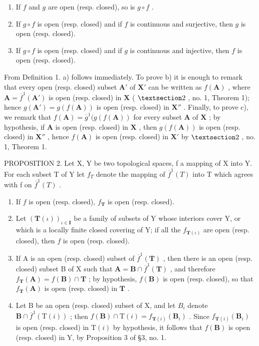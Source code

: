 \begin{enumerate}
\def\labelenumi{\alph{enumi})}
\item
  If \(f\) and \(g\) are open (resp. closed), so is \(g \circ f\) .
\item
  If \(g \circ f\) is open (resp. closed) and if \(f\) is continuous and surjective, then \(g\) is open (resp. closed).
\item
  If \(g \circ f\) is open (resp. closed) and if \(g\) is continuous and injective, then \(f\) is open (resp. closed).
\end{enumerate}

From Definition 1. a) follows immediately. To prove b) it is enough to remark that every open (resp. closed) subset \(\mathbf{A}'\) of \(\mathbf{X}'\) can be written as \(f(\mathbf{A})\) , where \(\mathbf{A} = \overline{f}^{1}(\mathbf{A}')\) is open (resp. closed) in \(\mathbf{X}\) ( \(\S 2\) , no. 1, Theorem 1); hence \(g(\mathbf{A}') = g(f(\mathbf{A}))\) is open (resp. closed) in \(\mathbf{X}''\) . Finally, to prove c), we remark that \(f(\mathbf{A}) = \overline{g}^{1}(g(f(\mathbf{A}))\) for every subset \(\mathbf{A}\) of \(\mathbf{X}\) ; by hypothesis, if \(\mathbf{A}\) is open (resp. closed) in \(\mathbf{X}\) , then \(g(f(\mathbf{A}))\) is open (resp. closed) in \(\mathbf{X}''\) , hence \(f(\mathbf{A})\) is open (resp. closed) in \(\mathbf{X}'\) by \(\S 2\) , no. 1, Theorem 1.

PROPOSITION 2. Let X, Y be two topological spaces, f a mapping of X into Y. For each subset T of Y let \(f_{T}\) denote the mapping of \(\overline{f}^{1}(T)\) into T which agrees with f on \(\overline{f}^{1}(T)\) .

\begin{enumerate}
\def\labelenumi{\alph{enumi})}
\item
  If \(f\) is open (resp. closed), \(f_{\mathbf{T}}\) is open (resp. closed).
\item
  Let \((\mathbf{T}(\iota))_{\iota \in \mathbf{I}}\) be a family of subsets of Y whose interiors cover Y, or which is a locally finite closed covering of Y; if all the \(f_{\mathbf{T}(\iota)}\) are open (resp. closed), then \(f\) is open (resp. closed).
\item
  If A is an open (resp. closed) subset of \(\overline{f}^{1}(\mathbf{T})\) , then there is an open (resp. closed) subset B of X such that \(\mathbf{A} = \mathbf{B} \cap \overline{f}^{1}(\mathbf{T})\) , and therefore \(f_{\mathbf{T}}(\mathbf{A}) = f(\mathbf{B}) \cap \mathbf{T}\) ; by hypothesis, \(f(\mathbf{B})\) is open (resp. closed), so that \(f_{\mathbf{T}}(\mathbf{A})\) is open (resp. closed) in \(\mathbf{T}\) .
\item
  Let B be an open (resp. closed) subset of X, and let \(B_{i}\) denote \(\mathbf{B} \cap \overline{f}^{1}(\mathrm{T}(i))\) ; then \(f(\mathbf{B}) \cap \mathrm{T}(i) = f_{\mathbf{T}(i)}(\mathbf{B}_{i})\) . Since \(f_{\mathbf{T}(i)}(\mathbf{B}_{i})\) is open (resp. closed) in \(\mathrm{T}(i)\) by hypothesis, it follows that \(f(\mathbf{B})\) is open (resp. closed) in Y, by Proposition 3 of §3, no. 1.
\end{enumerate}


